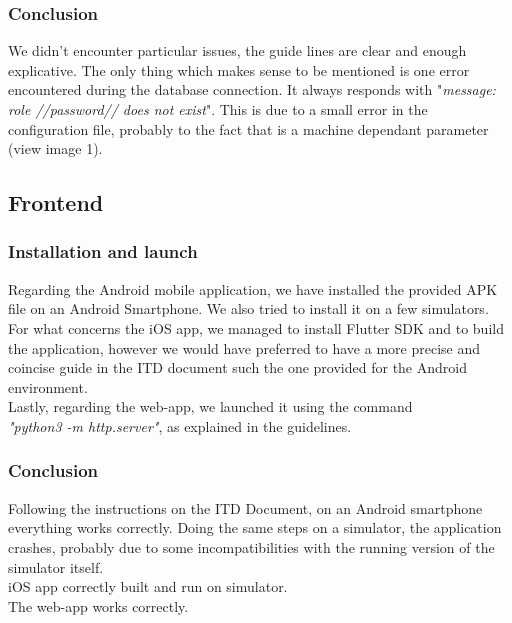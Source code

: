 \documentclass{article}
\begin{document}
\subsubsection{Conclusion}
We didn't encounter particular issues, the guide lines are clear and enough explicative.\newline
The only thing which makes sense to be mentioned is one error encountered during the database connection. It always responds with "\textit{message: role //password// does not exist}". This is due to a small error in the configuration file, probably to the fact that is a machine dependant parameter (view image 1).

\newpage	
\subsection{Frontend}
\subsubsection{Installation and launch}
Regarding the Android mobile application, we have installed the provided APK file on an Android Smartphone. We also tried to install it on a few simulators.\newline
\\For what concerns the iOS app, we managed to install Flutter SDK and to build the application, however we would have preferred to have a more precise and coincise guide in the ITD document such the one provided for the Android environment. \newline
\\Lastly, regarding the web-app, we launched it using the command\\ \textit{"python3 -m http.server"}, as explained in the guidelines.

\subsubsection{Conclusion}
Following the instructions on the ITD Document, on an Android smartphone everything works correctly.
Doing the same steps on a simulator, the application crashes, probably due to some incompatibilities with the running version of the simulator itself.	\newline
\\iOS app correctly built and run on simulator.\newline
\\The web-app works correctly.
\end{document}
